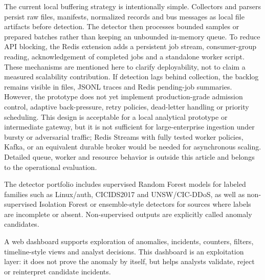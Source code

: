 \documentclass[conference]{IEEEtran}
\begin{document}
The current local buffering strategy is intentionally simple. Collectors and parsers persist raw files, manifests, normalized records and bus messages as local file artifacts before detection. The detector then processes bounded samples or prepared batches rather than keeping an unbounded in-memory queue. To reduce API blocking, the Redis extension adds a persistent job stream, consumer-group reading, acknowledgement of completed jobs and a standalone worker script. These mechanisms are mentioned here to clarify deployability, not to claim a measured scalability contribution. If detection lags behind collection, the backlog remains visible in files, JSONL traces and Redis pending-job summaries. However, the prototype does not yet implement production-grade admission control, adaptive back-pressure, retry policies, dead-letter handling or priority scheduling. This design is acceptable for a local analytical prototype or intermediate gateway, but it is not sufficient for large-enterprise ingestion under bursty or adversarial traffic; Redis Streams with fully tested worker policies, Kafka, or an equivalent durable broker would be needed for asynchronous scaling. Detailed queue, worker and resource behavior is outside this article and belongs to the operational evaluation.

The detector portfolio includes supervised Random Forest models for labeled families such as Linux/auth, CICIDS2017 and UNSW/CIC-DDoS, as well as non-supervised Isolation Forest or ensemble-style detectors for sources where labels are incomplete or absent. Non-supervised outputs are explicitly called anomaly candidates.

A web dashboard supports exploration of anomalies, incidents, counters, filters, timeline-style views and analyst decisions. This dashboard is an exploitation layer: it does not prove the anomaly by itself, but helps analysts validate, reject or reinterpret candidate incidents.
\end{document}
